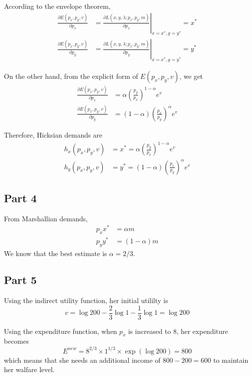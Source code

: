 \documentclass{article}
\begin{document}
According to the envelope theorem,
\begin{align*}
	\frac{\partial E(p_x,p_y,v)}{\partial p_x}&=\left.\frac{\partial L(x,y,\lambda;p_x,p_y,m)}{\partial p_x}\right|_{x=x^*,y=y^*}=x^*\\
	\frac{\partial E(p_x,p_y,v)}{\partial p_y}&=\left.\frac{\partial L(x,y,\lambda;p_x,p_y,m)}{\partial p_y}\right|_{x=x^*,y=y^*}=y^*
\end{align*}

On the other hand, from the explicit form of $E(p_x,p_y,v)$, we get
\begin{align*}
	\frac{\partial E(p_x,p_y,v)}{\partial p_x}&=\alpha\left(\frac{p_y}{p_x}\right)^{1-\alpha}e^v\\
	\frac{\partial E(p_x,p_y,v)}{\partial p_y}&=(1-\alpha)\left(\frac{p_x}{p_y}\right)^\alpha e^v
\end{align*}

Therefore, Hicksian demands are
\begin{align*}
	h_x(p_x,p_y,v)&=x^*=\alpha\left(\frac{p_y}{p_x}\right)^{1-\alpha}e^v\\
	h_y(p_x,p_y,v)&=y^*=(1-\alpha)\left(\frac{p_x}{p_y}\right)^\alpha e^v
\end{align*}

\subsection{Part 4}
From Marshallian demands,
\begin{align*}
	p_xx^*&=\alpha m\\
	p_yy^*&=(1-\alpha)m
\end{align*}
We know that the best estimate is $\alpha=2/3$.

\subsection{Part 5}
Using the indirect utility function, her initial utililty is
\begin{equation*}
	v=\log200-\frac{2}{3}\log1-\frac{1}{3}\log1=\log200
\end{equation*}

Using the expenditure function, when $p_x$ is increased to $8$, her expenditure becomes
\begin{equation*}
	E^{new}=8^{2/3}\times1^{1/3}\times\exp(\log200)=800
\end{equation*}
which means that she needs an additional income of $800-200=600$ to maintain her walfare level.
\end{document}

